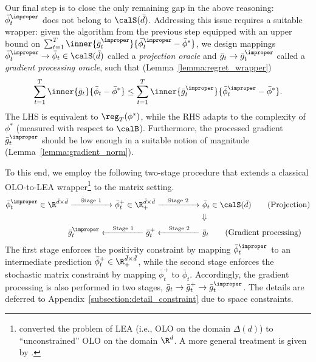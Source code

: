 \documentclass[10pt]{article}
\begin{document}
Our final step is to close the only remaining gap in the above reasoning: $\bar\phi_t^\improper$ does not belong to $\calS(\bar d)$. Addressing this issue requires a suitable wrapper: given the algorithm from the previous step equipped with an upper bound on $\sum_{t=1}^T\inner{\bar g_t^\improper}{\bar \phi^\improper_t-\bar \phi^*}$, we design mappings $\bar \phi^\improper_t\rightarrow \bar \phi_t\in\calS(\bar d)$ called a \emph{projection oracle} and $\bar g_t\rightarrow\bar g_t^\improper$ called a \emph{gradient processing oracle}, such that (Lemma~\ref{lemma:regret_wrapper})
\begin{equation*}
\sum_{t=1}^T\inner{\bar g_t}{\bar \phi_t-\bar \phi^*}\leq \sum_{t=1}^T\inner{\bar g_t^\improper}{\bar \phi^\improper_t-\bar \phi^*}. 
\end{equation*}
The LHS is equivalent to $\reg_T(\phi^*)$, while the RHS adapts to the complexity of $\phi^*$ (measured with respect to $\calB$). Furthermore, the processed gradient $\bar g_t^\improper$ should be low enough in a suitable notion of magnitude (Lemma~\ref{lemma:gradient_norm}). 

To this end, we employ the following two-stage procedure that extends a classical OLO-to-LEA wrapper\footnote{\cite{luo2015achieving,orabona2016coin} converted the problem of LEA (i.e., OLO on the domain $\Delta(d)$) to ``unconstrained'' OLO on the domain $\R^d$. A more general treatment is given by \cite{cutkosky2018black}.} \citep{luo2015achieving,orabona2016coin} to the matrix setting. 
\begin{align}
\bar \phi^\improper_t\in\R^{\bar d\times\bar d}\xrightarrow[]{\quad\text{Stage 1}\quad}\bar \phi^+_t\in\R_+^{\bar d\times\bar d}\xrightarrow[]{\quad\text{Stage 2}\quad}&~\bar \phi_t\in\calS(\bar d)\tag{Projection}\\
&\Downarrow\nonumber\\
\bar g^\improper_t\xleftarrow[]{\quad\text{Stage 1}\quad}\bar g^+_t\xleftarrow[]{\quad\text{Stage 2}\quad} & ~\bar g_t\tag{Gradient processing}
\end{align}
The first stage enforces the positivity constraint by mapping $\bar \phi^\improper_t$ to an intermediate prediction $\bar \phi^+_t\in\R_+^{\bar d\times\bar d}$, while the second stage enforces the stochastic matrix constraint by mapping $\bar \phi^+_t$ to $\bar \phi_t$. Accordingly, the gradient processing is also performed in two stages, $\bar g_t\rightarrow\bar g^+_t\rightarrow\bar g_t^\improper$. The details are deferred to Appendix~\ref{subsection:detail_constraint} due to space constraints. 
\end{document}
